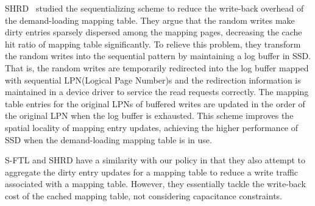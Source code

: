SHRD~\cite{kim2017shrd} studied the sequentializing scheme to reduce the write-back overhead of the demand-loading mapping table. They argue that the random writes make dirty entries sparsely dispersed among the mapping pages, decreasing the cache hit ratio of mapping table significantly. To relieve this problem, they transform the random writes into the sequential pattern by maintaining a log buffer in SSD. That is, the random writes are temporarily redirected into the log buffer mapped with sequential LPN(Logical Page Number)s and the redirection information is maintained in a device driver to service the read requests correctly. 
The mapping table entries for the original LPNs of buffered writes are updated in the order of the original LPN when the log buffer is exhausted. This scheme improves the spatial locality of mapping entry updates, achieving the higher performance of SSD when the demand-loading mapping table is in use. 

S-FTL and SHRD have a similarity with our policy in that they also attempt to aggregate the dirty entry updates for a mapping table to reduce a write traffic associated with a mapping table. However, they essentially tackle the write-back cost of the cached mapping table, not considering capacitance constraints. 

\iffalse
SHRD~\cite{kim2017shrd} pointed out that the mapping table size proportionally increases with the SSD capacity and thus 가 SSD 의 scalability 를 향상시키는 데에 큰 걸림돌이라고 지적함. DRAM 전체에 mapping table 을 유지하는 것은 비용이 많이 들어감. 이에 demand paging 으로 mapping table 을 small DRAM으로 caching 할 때, random writes 가 mapping table 의 spatial locality 를 저하시키는 문제를 지적함. 이에 user request 를 충분히 buffering 하여 reordering 하면 spatial locality 를 올릴 수 있다는 점에 착안하여, SSD의 일부 영역을 sequentializing 을 위한 log area 로 둠. random 패턴으로 유입되는 write 의 LPN을 임시로 sequential LPN 으로 맵핑하여 보관. original LPN to temporal LPN 정보는 device driver 에서 유지. Log Area 공간이 다 차면 그 때 가서 original LPN에 대한 entry 를 mapping table 에서 업데이트. Log area 를 충분히 키워서 버퍼링 효과를 높이면 spatial locality 가 좋아진다는 주장임. 우리거랑 key idea 측면에서 유사성이 있음. 우리는 user buffer 를 키워서 reordering 수행. map table 의 locality 를 올리는 것임. 그렇기 때문에 추가적인 redirection 을 device driver 에서 수행하지 않음. 그보다는 우린 배터리 용량 관점에서 reordering 기법을 이용함. 통상 성능과 신뢰성이 중요한 Enterprised-SSD 에서는 mapping table 전체를 배터리로 보호함. 그 환경에서는 caching eviction 에 의한 write traffic 이 중요하지 않으나 battery 이슈는 존재. 
\fi

